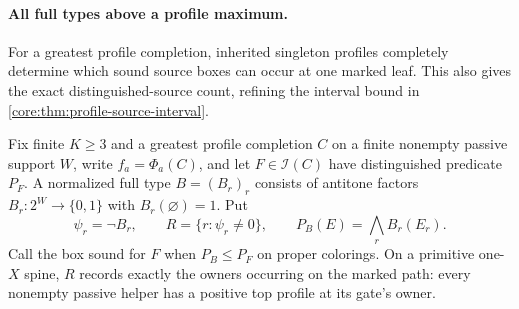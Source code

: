 \paragraph{All full types above a profile maximum.}
For a greatest profile completion, inherited singleton profiles completely
determine which sound source boxes can occur at one marked leaf. This also
gives the exact distinguished-source count, refining the interval bound in
\cref{core:thm:profile-source-interval}.

Fix finite $K\geq3$ and a greatest profile completion $C$ on a finite nonempty passive support
$W$, write $f_a=\Phi_a(C)$, and let $F\in\mathcal I(C)$ have distinguished
predicate $P_F$. A normalized full type $B=(B_r)_r$ consists of antitone
factors $B_r:2^W\to\{0,1\}$ with $B_r(\varnothing)=1$. Put
\[
 \psi_r=\neg B_r,\qquad R=\{r:\psi_r\ne0\},\qquad
 P_B(E)=\bigwedge_rB_r(E_r).
\]
Call the box sound for $F$ when $P_B\leq P_F$ on proper colorings.
On a primitive one-$X$ spine, $R$ records exactly the owners occurring on
the marked path: every nonempty passive helper has a positive top profile
at its gate's owner.

